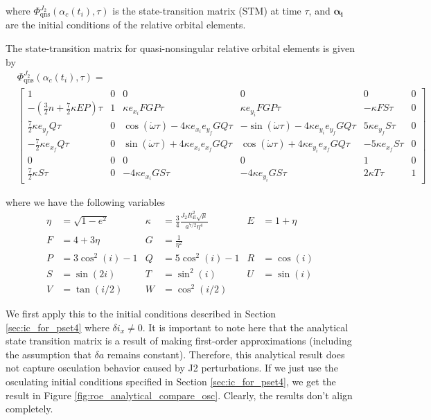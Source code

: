 where $\Phi^{J_2}_{\text{qns}}(\alpha_c(t_i), \tau)$ is the state-transition matrix (STM) at time $\tau$, and $\boldsymbol{\alpha_{i}}$ are the initial conditions of the relative orbital elements.

The state-transition matrix for quasi-nonsingular relative orbital elements is given by
\begin{align}
&\Phi^{J_2}_{\text{qns}}(\alpha_c(t_i), \tau) = \nonumber \\ 
&\begin{bmatrix}
1 & 0 & 0 & 0 & 0 & 0 \\
-\left( \frac{3}{2}n + \frac{7}{2} \kappa E P \right)\tau & 1 & \kappa e_{x_i} F G P \tau & \kappa e_{y_i} F G P \tau & -\kappa F S \tau & 0 \\
\frac{7}{2} \kappa e_{y_f} Q \tau & 0 & \cos(\dot{\omega} \tau) - 4\kappa e_{x_i} e_{y_f} G Q \tau & -\sin(\dot{\omega} \tau) - 4\kappa e_{y_i} e_{y_f} G Q \tau & 5\kappa e_{y_f} S \tau & 0 \\
-\frac{7}{2} \kappa e_{x_f} Q \tau & 0 & \sin(\dot{\omega} \tau) + 4\kappa e_{x_i} e_{x_f} G Q \tau & \cos(\dot{\omega} \tau) + 4\kappa e_{y_i} e_{x_f} G Q \tau & -5\kappa e_{x_f} S \tau & 0 \\
0 & 0 & 0 & 0 & 1 & 0 \\
\frac{7}{2} \kappa S \tau & 0 & -4 \kappa e_{x_i} G S \tau & -4 \kappa e_{y_i} G S \tau & 2 \kappa T \tau & 1
\end{bmatrix} \label{eq:stm_matrix}
\end{align}

where we have the following variables
\begin{align*}
\eta &= \sqrt{1 - e^2} &
\kappa &= \frac{3}{4} \frac{J_2 R_E^2 \sqrt{\mu}}{a^{7/2} \eta^4} &
E &= 1 + \eta \\
F &= 4 + 3\eta &
G &= \frac{1}{\eta^2} & \\
P &= 3\cos^2(i) - 1 &
Q &= 5\cos^2(i) - 1 &
R &= \cos(i) \\
S &= \sin(2i) &
T &= \sin^2(i) &
U &= \sin(i) \\
V &= \tan(i/2) &
W &= \cos^2(i/2)
\end{align*}

We first apply this to the initial conditions described in Section \ref{sec:ic_for_pset4} where $\delta i_x \neq 0$.
It is important to note here that the analytical state transition matrix is a result of making first-order approximations (including the assumption that $\delta a$ remains constant). Therefore, this analytical result does not capture osculation behavior caused by J2 perturbations. If we just use the osculating initial conditions specified in Section \ref{sec:ic_for_pset4}, we get the result in Figure \ref{fig:roe_analytical_compare_osc}. Clearly, the results don't align completely.

